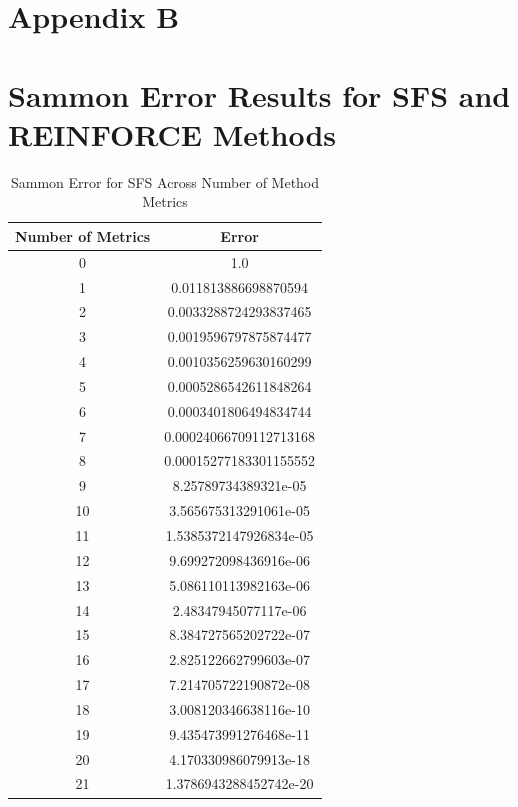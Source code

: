 \section*{Appendix B}
\label{appendix:b}

\section*{Sammon Error Results for SFS and REINFORCE Methods}

\begin{table}[H]
\centering
\caption{Sammon Error for SFS Across Number of Method Metrics}
\label{tab:sfs_method}
\begin{tabular}{|c|c|}
\hline
\textbf{Number of Metrics} & \textbf{Error} \\ \hline
0 & 1.0 \\ \hline
1 & 0.011813886698870594 \\ \hline
2 & 0.0033288724293837465 \\ \hline
3 & 0.0019596797875874477 \\ \hline
4 & 0.0010356259630160299 \\ \hline
5 & 0.0005286542611848264 \\ \hline
6 & 0.0003401806494834744 \\ \hline
7 & 0.00024066709112713168 \\ \hline
8 & 0.00015277183301155552 \\ \hline
9 & 8.25789734389321e-05 \\ \hline
10 & 3.565675313291061e-05 \\ \hline
11 & 1.5385372147926834e-05 \\ \hline
12 & 9.699272098436916e-06 \\ \hline
13 & 5.086110113982163e-06 \\ \hline
14 & 2.48347945077117e-06 \\ \hline
15 & 8.384727565202722e-07 \\ \hline
16 & 2.825122662799603e-07 \\ \hline
17 & 7.214705722190872e-08 \\ \hline
18 & 3.008120346638116e-10 \\ \hline
19 & 9.435473991276468e-11 \\ \hline
20 & 4.170330986079913e-18 \\ \hline
21 & 1.3786943288452742e-20 \\ \hline
\end{tabular}
\end{table}


